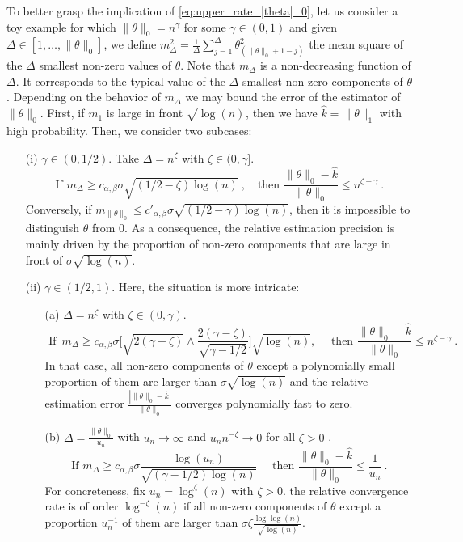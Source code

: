 \documentclass[twoside,11pt]{article}
\newcommand{\<}{\langle}
\renewcommand{\>}{\rangle}
\begin{document}
To better grasp the implication of \eqref{eq:upper_rate_|theta|_0}, let us consider a toy example for which $\|\theta\|_0= n^{\gamma}$ for some $\gamma\in (0,1)$ and given $\Delta\in [1,\ldots,\|\theta\|_0]$, we define $m^2_{\Delta}= \frac{1}{\Delta}\sum_{j=1}^{\Delta}\theta_{(\|\theta\|_0+1-j)}^2$ the mean square of the $\Delta$ smallest non-zero values of $\theta$. Note that $m_{\Delta}$ is a non-decreasing function of $\Delta$. It corresponds to the typical value of the $\Delta$ smallest non-zero components of $\theta$. 
Depending on the behavior of $m_{\Delta}$ we may bound the error of the estimator of $\|\theta\|_0$. First, if $m_1$ is large in front $\sqrt{\log(n)}$, then we have  $\widehat{k}=\|\theta\|_1$ with high probability. Then, we consider two subcases:
\begin{enumerate}
 \item[(i)] $\gamma\in (0,1/2)$. Take $\Delta=n^{\zeta}$ with $\zeta\in (0,\gamma]$. 
 \[\text{If }m_{\Delta}\geq c_{\alpha,\beta} \sigma   \sqrt{(1/2 - \zeta) \log(n)}\ , \quad \text{then } \frac{\|\theta\|_0-\widehat{k}}{\|\theta\|_0}\leq n^{\zeta-\gamma}\ .\] 
 Conversely, if $m_{\|\theta\|_0}\leq c'_{\alpha,\beta}  \sigma   \sqrt{(1/2 - \gamma) \log(n)}$, then it is impossible to distinguish $\theta$ from $0$. As a consequence, the relative estimation precision is mainly driven by the proportion of non-zero components that are large in front of $\sigma  \sqrt{\log(n)}$. 
 
 \item [(ii)] $\gamma\in (1/2,1)$. Here, the situation is more intricate:
 \begin{enumerate}
  \item [(a)] $\Delta=n^{\zeta}$ with $\zeta\in (0,\gamma)$.
  \[\text{ If }\, m_\Delta\geq c_{\alpha,\beta}\sigma  \big[\sqrt{2(\gamma-\zeta)}\wedge \frac{2(\gamma-\zeta)}{\sqrt{\gamma-1/2}} \big] \sqrt{ \log(n)},\quad  \text{ then }  \frac{\|\theta\|_0-\widehat{k}}{\|\theta\|_0}\leq n^{\zeta-\gamma}\ .\] In that case, all non-zero components of $\theta$ except a polynomially small proportion of them are larger than $\sigma  \sqrt{\log(n)}$ and the relative estimation error $\frac{|\|\theta\|_0-\widehat{k}|}{\|\theta\|_0}$ converges polynomially fast to zero.
  \item [(b)]  $\Delta=\frac{\|\theta\|_0}{u_n}$ with $u_n\to \infty$ and $u_nn^{-\zeta}\to 0$ for all $\zeta>0$ .  
  \[\text{If }m_\Delta\geq c_{\alpha,\beta}\sigma  \frac{\log(u_n)}{\sqrt{(\gamma-1/2)\log(n)}}\quad \text{ then }  \frac{\|\theta\|_0-\widehat{k}}{\|\theta\|_0}\leq \frac{1}{u_n}\ . \]
  For concreteness, fix $u_n=\log^{\zeta}(n)$ with $\zeta>0$. the relative convergence rate is of order $\log^{-\zeta}(n)$ if all non-zero components of $\theta$ except a proportion $u^{-1}_n$ of them are larger than $\sigma  \zeta\tfrac{\log\log(n)}{\sqrt{\log(n)}}$. 
  

\end{enumerate}
\end{enumerate}
\end{document}

